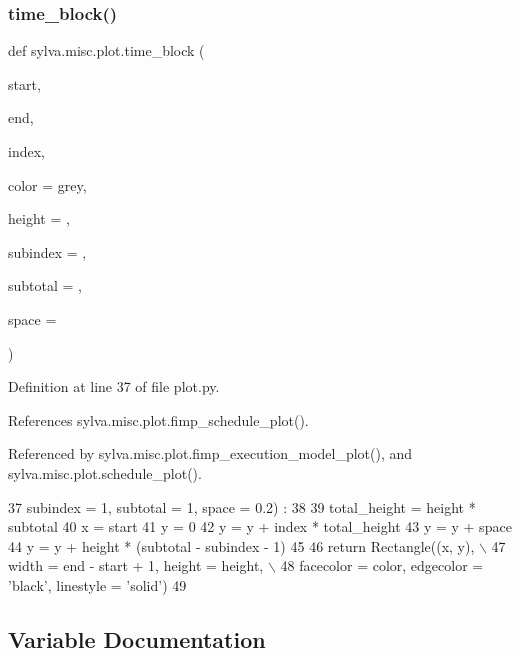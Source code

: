 \subsubsection{\texorpdfstring{time\+\_\+block()}{time\_block()}}
{\footnotesize\ttfamily def sylva.\+misc.\+plot.\+time\+\_\+block (\begin{DoxyParamCaption}\item[{}]{start,  }\item[{}]{end,  }\item[{}]{index,  }\item[{}]{color = {\ttfamily \textquotesingle{}grey\textquotesingle{}},  }\item[{}]{height = {},  }\item[{}]{subindex = {},  }\item[{}]{subtotal = {},  }\item[{}]{space = {} }\end{DoxyParamCaption})}



Definition at line 37 of file plot.\+py.



References sylva.\+misc.\+plot.\+fimp\+\_\+schedule\+\_\+plot().



Referenced by sylva.\+misc.\+plot.\+fimp\+\_\+execution\+\_\+model\+\_\+plot(), and sylva.\+misc.\+plot.\+schedule\+\_\+plot().


\begin{DoxyCode}
37     subindex = 1, subtotal = 1, space = 0.2) :
38 
39     total\_height = height * subtotal
40     x = start
41     y = 0
42     y = y + index * total\_height
43     y = y + space
44     y = y + height * (subtotal - subindex - 1)
45 
46     \textcolor{keywordflow}{return} Rectangle((x, y), \(\backslash\)
47       width = end - start + 1, height = height, \(\backslash\)
48       facecolor = color, edgecolor = \textcolor{stringliteral}{'black'}, linestyle = \textcolor{stringliteral}{'solid'})
49 
\end{DoxyCode}


\subsection{Variable Documentation}
\mbox{\label{namespacesylva_1_1misc_1_1plot_a7500c696078a3d942b466b4627141020}} 
